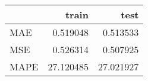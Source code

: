 \begin{tabular}{lrr}
\toprule
{} &      train &       test \\
\midrule
MAE  &   0.519048 &   0.513533 \\
MSE  &   0.526314 &   0.507925 \\
MAPE &  27.120485 &  27.021927 \\
\bottomrule
\end{tabular}
